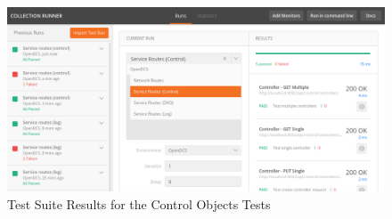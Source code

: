         \begin{figure}[H]
          \includegraphics[width=\textwidth]{figures/testing/postman-control-suite-results}
          \caption{Test Suite Results for the Control Objects Tests}
          \label{fig:test-postman-control-suite}
        \end{figure}



